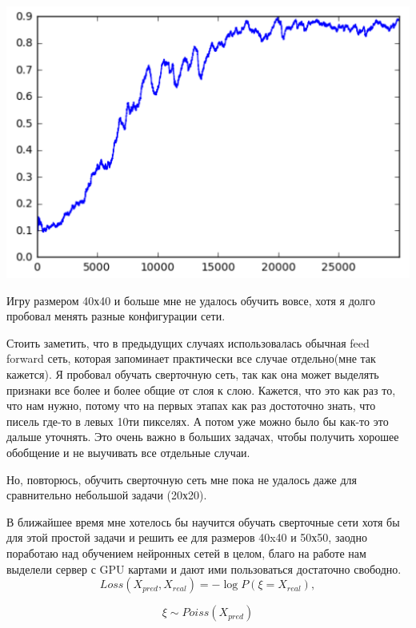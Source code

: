 \documentclass[a4paper]{article}
\begin{document}
\begin{center}
\includegraphics[scale=0.5]{perf30}
\end{center} 

Игру размером 40х40 и больше мне не удалось обучить вовсе, хотя я долго пробовал менять разные конфигурации сети. 

Стоить заметить, что в предыдущих случаях использовалась обычная feed forward сеть, которая запоминает практически все случае отдельно(мне так кажется). 
Я пробовал обучать сверточную сеть, так как она может выделять признаки все более и более общие от слоя к слою. Кажется, что это как раз то, что нам нужно, потому что на первых этапах как раз достоточно знать, что писель где-то в левых 10ти пикселях. А потом уже можно было бы как-то это дальше уточнять.
Это очень важно в больших задачах, чтобы получить хорошее обобщение и не выучивать все отдельные случаи.

Но, повторюсь, обучить сверточную сеть мне пока не удалось даже для сравнительно небольшой задачи (20х20).


В ближайшее время мне хотелось бы научится обучать сверточные сети хотя бы для этой простой задачи и решить ее для размеров 40x40 и 50х50, заодно поработаю над обучением нейронных сетей в целом, благо на работе нам выделели сервер с GPU картами и дают ими пользоваться достаточно свободно.
$$
	Loss(X_{pred}, X_{real}) = - \log	P(\xi = X_{real}), 	
$$

$$
	\xi \sim Poiss(X_{pred}) 
$$
\end{document}
